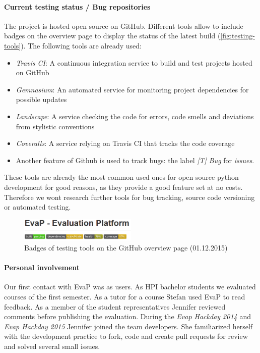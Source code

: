 \paragraph{Current testing status / Bug repositories}
The project is hosted open source on GitHub.
Different tools allow to include badges on the overview page to display the status of the latest build (\autoref{fig:testing-tools}).
The following tools are already used:
\begin{itemize}
    \item \emph{Travis CI}: 
    A continuous integration service to build and test projects hosted on GitHub
    \item \emph{Gemnasium}:
     An automated service for monitoring project dependencies for possible updates
     \item \emph{Landscape}:
     A service checking the code for errors, code smells and deviations from stylistic conventions
     \item  \emph{Coveralls}:
     A service relying on Travis CI that tracks the code coverage
     \item 
     Another feature of Github is used to track bugs: the label \emph{[T] Bug} for \emph{issues}.
\end{itemize}
These tools are already the most common used ones for open source python development for good reasons, as they provide a good feature set at no costs.
Therefore we wont research further tools for bug tracking, source code versioning or automated testing.
\begin{figure}[h]
    \centering
    \includegraphics[width=0.5\textwidth, keepaspectratio]{graphics/testing-tools-github}
    \caption{Badges of testing tools on the GitHub overview page (01.12.2015)}
    \label{fig:testing-tools}
\end{figure}


\paragraph{Personal involvement}
Our first contact with EvaP was as users. 
As HPI bachelor students we evaluated courses of the first semester.
As a tutor for a course Stefan used EvaP to read feedback.
As a member of the student representatives Jennifer reviewed comments before publishing the evaluation.
During the \emph{Evap Hackday 2014} and \emph{Evap Hackday 2015} Jennifer joined the team developers.
She familiarized herself with the development practice to fork, code and create pull requests for review and solved several small issues.
